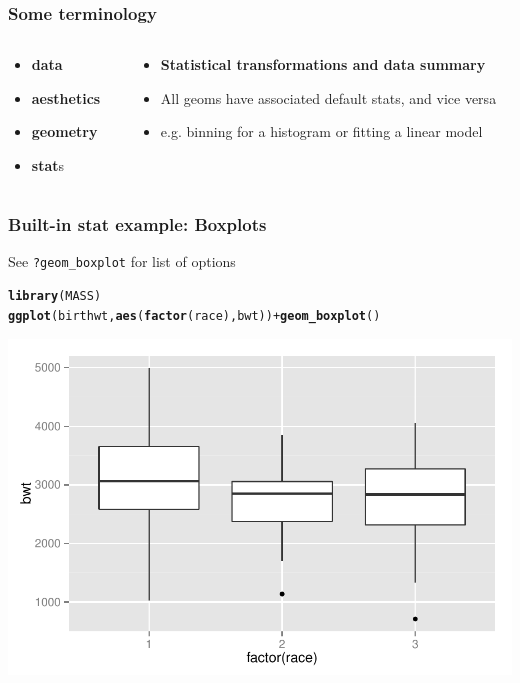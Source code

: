 \documentclass{beamer}\usepackage[]{graphicx}\usepackage[]{color}
\makeatletter
\newcommand{\hlopt}[1]{\textcolor[rgb]{0,0,0}{#1}}%
\newcommand{\hlstd}[1]{\textcolor[rgb]{0.345,0.345,0.345}{#1}}%
\newcommand{\hlkwd}[1]{\textcolor[rgb]{0.737,0.353,0.396}{\textbf{#1}}}%
\newenvironment{kframe}{%
 \def\at@end@of@kframe{}%
 \ifinner\ifhmode%
  \def\at@end@of@kframe{\end{minipage}}%
  \begin{minipage}{\columnwidth}%
 \fi\fi%
 \def\FrameCommand##1{\hskip\@totalleftmargin \hskip-\fboxsep
 \colorbox{shadecolor}{##1}\hskip-\fboxsep
     \hskip-\linewidth \hskip-\@totalleftmargin \hskip\columnwidth}%
 \MakeFramed {\advance\hsize-\width
   \@totalleftmargin\z@ \linewidth\hsize
   \@setminipage}}%
 {\par\unskip\endMakeFramed%
 \at@end@of@kframe}
\newenvironment{knitrout}{}{} %
\makeatother
\begin{document}
\begin{frame}[fragile]
\frametitle{Some terminology}
\begin{columns}[t]

\begin{column}[T]{3cm}
\begin{itemize}
    \item \textbf{\color{gray}data}
    \item \textbf{\color{gray}aesthetics}
    \item \textbf{\color{gray}geometry}
    \item \textbf{stat}s
\end{itemize}
\end{column}

\begin{column}[T]{8cm}
\begin{itemize}
    \item \textbf{Statistical transformations and data summary}
    \item All geoms have associated default stats, and vice versa
    \item e.g. binning for a histogram or fitting a linear model
\end{itemize}
\end{column}

\end{columns}
\end{frame}


\begin{frame}[fragile]
\frametitle{Built-in stat example: Boxplots}
See \texttt{?geom\_boxplot} for list of options
\begin{knitrout}\footnotesize
{}\color{fgcolor}\begin{kframe}
\begin{alltt}
\hlkwd{library}\hlstd{(MASS)}
\hlkwd{ggplot}\hlstd{(birthwt,} \hlkwd{aes}\hlstd{(}\hlkwd{factor}\hlstd{(race), bwt))} \hlopt{+} \hlkwd{geom_boxplot}\hlstd{()}
\end{alltt}
\end{kframe}

{\centering \includegraphics[width=.75\linewidth]{figure/boxplots1_} 

}



\end{knitrout}
\end{frame}
\end{document}
